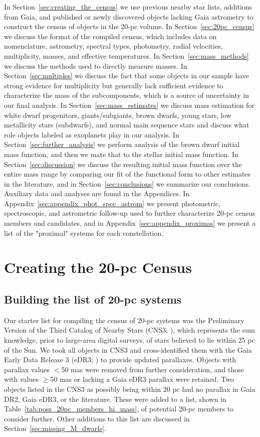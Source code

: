 \documentclass[twocolumn,tighten,twocolappendix]{aastex631}
\begin{document}
In Section~\ref{sec:creating_the_census} we use previous nearby star lists, additions from Gaia, and published or newly discovered objects lacking Gaia astrometry to construct the census of objects in the 20-pc volume. In Section~\ref{sec:20pc_census} we discuss the format of the compiled census, which includes data on nomenclature, astrometry, spectral types, photometry, radial velocities, multiplicity, masses, and effective temperatures. In Section~\ref{sec:mass_methods} we discuss the methods used to directly measure masses. In Section~\ref{sec:multiples} we discuss the fact that some objects in our sample have strong evidence for multiplicity but generally lack sufficient evidence to characterize the mass of the subcomponents, which is a source of uncertainty in our final analysis. In Section~\ref{sec:mass_estimates} we discuss mass estimation for white dwarf progenitors, giants/subgiants, brown dwarfs, young stars, low metallicity stars (subdwarfs), and normal main sequence stars and discuss what role objects labeled as exoplanets play in our analysis. In Section~\ref{sec:further_analysis} we perform analysis of the brown dwarf initial mass function, and then we mate that to the stellar initial mass function. In Section~\ref{sec:discussion} we discuss the resulting initial mass function over the entire mass range by comparing our fit of the functional form to other estimates in the literature, and in Section~\ref{sec:conclusions} we summarize our conclusions. Auxiliary data and analyses are found in the Appendices. In Appendix~\ref{sec:appendix_phot_spec_astrom} we present photometric, spectroscopic, and astrometric follow-up used to further characterize 20-pc census members and candidates, and in Appendix~\ref{sec:appendix_proximas} we present a list of the "proximal" systems for each constellation.

\section{Creating the 20-pc Census\label{sec:creating_the_census}}

\subsection{Building the list of 20-pc systems\label{sec:building_the_list_of_20pc_systems}}

Our starter list for compiling the census of 20-pc systems was the Preliminary Version of the Third Catalog of Nearby Stars (CNS3; \citealt{gliese1991}), which represents the sum knowledge, prior to large-area digital surveys, of stars believed to lie within 25 pc of the Sun. We took all objects in CNS3 and cross-identified them with the Gaia Early Data Release 3 (eDR3; \citealt{gaia2020}) to provide updated parallaxes. Objects with parallax values $<$50 mas were removed from further consideration, and those with values $\ge$50 mas or lacking a Gaia eDR3 parallax were retained. Two objects listed in the CNS3 as possibly being within 20 pc had no parallax in Gaia DR2, Gaia eDR3, or the literature. These were added to a list, shown in Table~\ref{tab:poss_20pc_members_hi_mass}, of potential 20-pc members to consider further. Other additions to this list are discussed in Section~\ref{sec:missing_M_dwarfs}.
\end{document}

